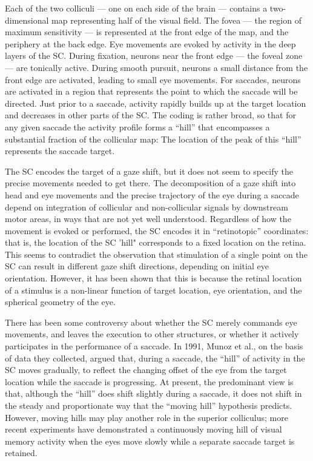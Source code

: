 Each of the two colliculi --- one on each side of the brain --- contains a two-dimensional map representing half of the visual field. The fovea --- the region of maximum sensitivity --- is represented at the front edge of the map, and the periphery at the back edge. Eye movements are evoked by activity in the deep layers of the SC. During fixation, neurons near the front edge --- the foveal zone --- are tonically active. During smooth pursuit, neurons a small distance from the front edge are activated, leading to small eye movements. For saccades, neurons are activated in a region that represents the point to which the saccade will be directed. Just prior to a saccade, activity rapidly builds up at the target location and decreases in other parts of the SC. The coding is rather broad, so that for any given saccade the activity profile forms a ``hill'' that encompasses a substantial fraction of the collicular map: The location of the peak of this ``hill'' represents the saccade target.

The SC encodes the target of a gaze shift, but it does not seem to specify the precise movements needed to get there. The decomposition of a gaze shift into head and eye movements and the precise trajectory of the eye during a saccade depend on integration of collicular and non-collicular signals by downstream motor areas, in ways that are not yet well understood. Regardless of how the movement is evoked or performed, the SC encodes it in ``retinotopic'' coordinates: that is, the location of the SC 'hill" corresponds to a fixed location on the retina. This seems to contradict the observation that stimulation of a single point on the SC can result in different gaze shift directions, depending on initial eye orientation. However, it has been shown that this is because the retinal location of a stimulus is a non-linear function of target location, eye orientation, and the spherical geometry of the eye.

There has been some controversy about whether the SC merely commands eye movements, and leaves the execution to other structures, or whether it actively participates in the performance of a saccade. In 1991, Munoz et al., on the basis of data they collected, argued that, during a saccade, the ``hill'' of activity in the SC moves gradually, to reflect the changing offset of the eye from the target location while the saccade is progressing. At present, the predominant view is that, although the ``hill'' does shift slightly during a saccade, it does not shift in the steady and proportionate way that the ``moving hill'' hypothesis predicts. However, moving hills may play another role in the superior colliculus; more recent experiments have demonstrated a continuously moving hill of visual memory activity when the eyes move slowly while a separate saccade target is retained.

